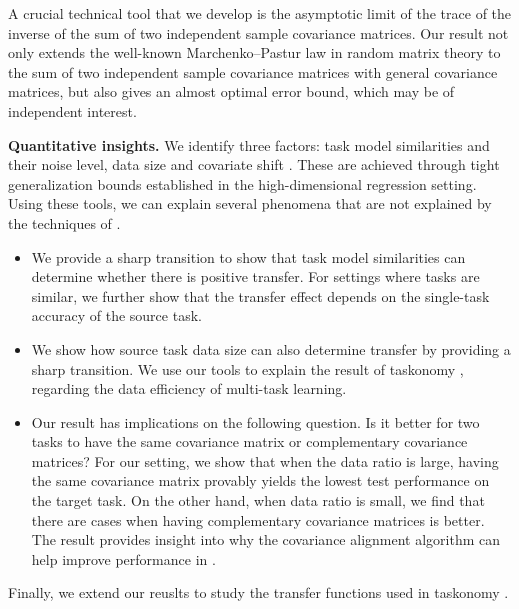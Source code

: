 	A crucial technical tool that we develop is the asymptotic limit of the trace of the inverse of the sum of two independent sample covariance matrices. Our result not only extends the well-known Marchenko–Pastur law in random matrix theory to the sum of two independent sample covariance matrices with general covariance matrices, but also gives an almost optimal error bound, which may be of independent interest.

\textbf{Quantitative insights.}
	We identify three factors: task model similarities and their noise level, data size and covariate shift \cite{PY09,K18}.
	These are achieved through tight generalization bounds established in the high-dimensional regression setting.
	Using these tools, we can explain several phenomena that are not explained by the techniques of \cite{WZR20}.
	\begin{itemize}
		\item We provide a sharp transition to show that task model similarities can determine whether there is positive transfer.
		For settings where tasks are similar, we further show that the transfer effect depends on the single-task accuracy of the source task.
		\item We show how source task data size can also determine transfer by providing a sharp transition.
		We use our tools to explain the result of taskonomy \cite{ZSSGM18}, regarding the data efficiency of multi-task learning.
		\item Our result has implications on the following question.
	Is it better for two tasks to have the same covariance matrix or complementary covariance matrices?
	For our setting, we show that when the data ratio is large, having the same covariance matrix provably yields the lowest test performance on the target task.
	On the other hand, when data ratio is small, we find that there are cases when having complementary covariance matrices is better.
	The result provides insight into why the covariance alignment algorithm can help improve performance in \cite{WZR20}.
	\end{itemize}

Finally, we extend our reuslts to study the transfer functions used in taskonomy \cite{ZSSGM18}.

